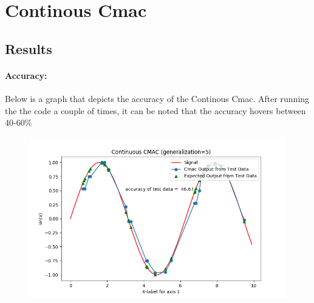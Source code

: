 \documentclass{article}
\begin{document}
\section{Continous Cmac}
\subsection{Results}
  \paragraph{Accuracy:}
    Below is a graph that depicts the accuracy of the Continous Cmac. After running the the code a couple of times, it can
    be noted that the accuracy hovers between 40-60\%
  \begin{figure}[h!]
     \centering
     \includegraphics[scale=0.65]{./Results/continousAccuracy.png}
  \end{figure}
\end{document}

